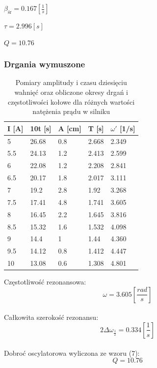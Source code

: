 \documentclass[]{article}
\begin{document}
	$\beta_{\text{śr}} = 0.167 \left[ \frac{1}{s}\right] $
	
	$\tau=2.996[s]$
	
	$Q = 10.76$
	
	\subsubsection{Drgania wymuszone}
	
	\begin{table}[h]
		\centering
		\caption{Pomiary amplitudy i czasu dziesięciu wahnięć oraz obliczone okresy drgań i częstotliwości kołowe dla różnych wartości natężenia prądu w silniku}
		\begin{tabular}{|l|l|l|l|l|}
			\hline
			
			I [A] & 10t [s] & A [cm] & T [s] & $\omega'$ [1/s] \\ \hline
			5 & 26.68 & 0.8 & 2.668 & 2.349 \\ \hline
			5.5 & 24.13 & 1.2 & 2.413 & 2.599 \\ \hline
			6 & 22.08 & 1.2 & 2.208 & 2.841 \\ \hline
			6.5 & 20.17 & 1.8 & 2.017 & 3.111 \\ \hline
			7 & 19.2 & 2.8 & 1.92 & 3.268 \\ \hline
			7.5 & 17.41 & 4.8 & 1.741 & 3.605 \\ \hline
			8 & 16.45 & 2.2 & 1.645 & 3.816 \\ \hline
			8.5 & 15.32 & 1.6 & 1.532 & 4.098 \\ \hline
			9 & 14.4 & 1 & 1.44 & 4.360 \\ \hline
			9.5 & 14.12 & 0.8 & 1.412 & 4.447 \\ \hline
			10 & 13.08 & 0.6 & 1.308 & 4.801 \\ \hline
			
		\end{tabular}
	\end{table}
	
	Częstotliwość rezonansowa:
	$$\omega = 3.605 \left[ \frac{rad}{s}\right]$$\\
	Całkowita szerokość rezonansu:
	$$2\Delta\omega_{\frac{1}{2}} = 0.334 \left[ \frac{1}{s}\right] $$\\	
	Dobroć oscylatorowa wyliczona ze wzoru (7):
	$$Q = 10.76$$
	
\end{document}
